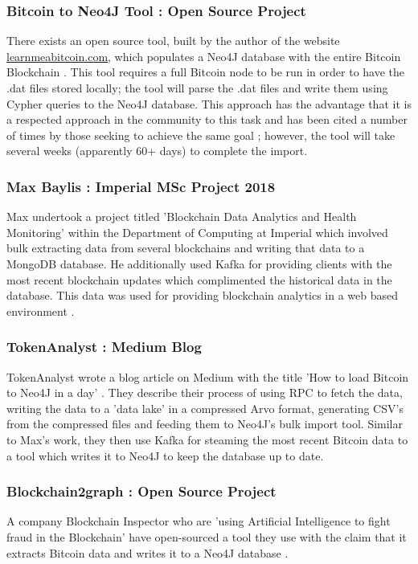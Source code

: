\subsubsection{Bitcoin to Neo4J Tool : Open Source Project}
There exists an open source tool, built by the author of the website \url{learnmeabitcoin.com}, which populates a Neo4J database with the entire Bitcoin Blockchain \cite{RefWorks:doc:5c98e031e4b068320632cef2}. This tool requires a full Bitcoin node to be run in order to have the .dat files stored locally; the tool will parse the .dat files and write them using Cypher queries to the Neo4J database. This approach has the advantage that it is a respected approach in the community to this task and has been cited a number of times by those seeking to achieve the same goal \cite{RefWorks:doc:5c98e0cde4b044512c0b8641}; however, the tool will take several weeks (apparently 60+ days) to complete the import. 

\subsubsection{Max Baylis : Imperial MSc Project 2018}\label{background-max-baylist-project}
Max undertook a project titled 'Blockchain Data Analytics and Health Monitoring' within the Department of Computing at Imperial \cite{RefWorks:doc:5c6bd151e4b041254f892045} which involved bulk extracting data from several blockchains and writing that data to a MongoDB database. He additionally used Kafka for providing clients with the most recent blockchain updates which complimented the historical data in the database. This data was used for providing blockchain analytics in a web based environment \cite{RefWorks:doc:5c6bd151e4b041254f892045}. 

\subsubsection{TokenAnalyst : Medium Blog}
TokenAnalyst wrote a blog article on Medium with the title 'How to load Bitcoin to Neo4J in a day' \cite{RefWorks:doc:5c98e0cde4b044512c0b8641}. They describe their process of using RPC to fetch the data, writing the data to a 'data lake' in a compressed Arvo format, generating CSV's from the compressed files and feeding them to Neo4J's bulk import tool. Similar to Max's work, they then use Kafka for steaming the most recent Bitcoin data to a tool which writes it to Neo4J to keep the database up to date. 

\subsubsection{Blockchain2graph : Open Source Project}
A company Blockchain Inspector who are 'using Artificial Intelligence to fight fraud in the Blockchain' have open-sourced a tool they use with the claim that it extracts Bitcoin data and writes it to a Neo4J database \cite{RefWorks:doc:5cac6184e4b01c076c63e173}.

